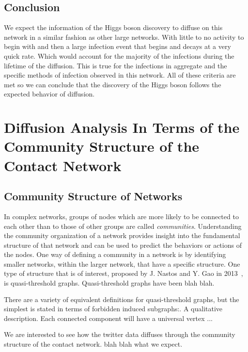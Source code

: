 \documentclass[12pt, oneside, openany]{article} %
\begin{document}
\subsection{Conclusion}
We expect the information of the Higgs boson discovery to diffuse on this network in a similar fashion as other large networks. With little to no activity to begin with and then a large infection event that begins and decays at a very quick rate. Which would account for the majority of the infections during the lifetime of the diffusion. This is true for the infections in aggregate and the specific methods of infection observed in this network. All of these criteria are met so we can conclude that the discovery of the Higgs boson follows the expected behavior of diffusion.

\section{Diffusion Analysis In Terms of the Community Structure of the Contact Network}
\subsection{Community Structure of Networks}
In complex networks, groups of nodes which are more likely to be connected to each other than to those of other groups are called \emph{communities}. Understanding the community organization of a network provides insight into the fundamental structure of that network and can be used to predict the behaviors or actions of the nodes. One way of defining a community in a network is by identifying smaller networks, within the larger network, that have a specific structure. One type of structure that is of interest, proposed by J. Nastos and Y. Gao in 2013~\cite{nastos:2013}, is quasi-threshold graphs. Quasi-threshold graphs have been blah blah.

There are a variety of equivalent definitions for quasi-threshold graphs, but the simplest is stated in terms of forbidden induced subgraphs:. A qualitative description. Each connected component will have a universal vertex ... 

We are interested to see how the twitter data diffuses through the community structure of the contact network. blah blah what we expect.
\end{document}
